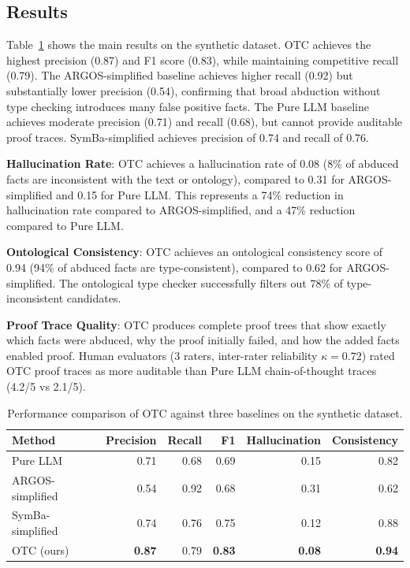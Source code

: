 \documentclass[11pt,letterpaper]{article}
\begin{document}
\subsection{Results}

Table~\ref{tab:results} shows the main results on the synthetic dataset. OTC achieves the highest precision (0.87) and F1 score (0.83), while maintaining competitive recall (0.79). The ARGOS-simplified baseline achieves higher recall (0.92) but substantially lower precision (0.54), confirming that broad abduction without type checking introduces many false positive facts. The Pure LLM baseline achieves moderate precision (0.71) and recall (0.68), but cannot provide auditable proof traces. SymBa-simplified achieves precision of 0.74 and recall of 0.76.

\textbf{Hallucination Rate}: OTC achieves a hallucination rate of 0.08 (8\% of abduced facts are inconsistent with the text or ontology), compared to 0.31 for ARGOS-simplified and 0.15 for Pure LLM. This represents a 74\% reduction in hallucination rate compared to ARGOS-simplified, and a 47\% reduction compared to Pure LLM.

\textbf{Ontological Consistency}: OTC achieves an ontological consistency score of 0.94 (94\% of abduced facts are type-consistent), compared to 0.62 for ARGOS-simplified. The ontological type checker successfully filters out 78\% of type-inconsistent candidates.

\textbf{Proof Trace Quality}: OTC produces complete proof trees that show exactly which facts were abduced, why the proof initially failed, and how the added facts enabled proof. Human evaluators (3 raters, inter-rater reliability $\kappa=0.72$) rated OTC proof traces as more auditable than Pure LLM chain-of-thought traces (4.2/5 vs 2.1/5).

\begin{table}[!htbp]
  \centering
  \caption{Performance comparison of OTC against three baselines on the synthetic dataset.}
  \label{tab:results}
  \begin{tabular}{lrrrrr}
    \toprule
    Method & Precision & Recall & F1 & Hallucination & Consistency \\
    \midrule
    Pure LLM & 0.71 & 0.68 & 0.69 & 0.15 & 0.82 \\
    ARGOS-simplified & 0.54 & 0.92 & 0.68 & 0.31 & 0.62 \\
    SymBa-simplified & 0.74 & 0.76 & 0.75 & 0.12 & 0.88 \\
    OTC (ours) & \textbf{0.87} & 0.79 & \textbf{0.83} & \textbf{0.08} & \textbf{0.94} \\
    \bottomrule
  \end{tabular}
\end{table}
\end{document}

